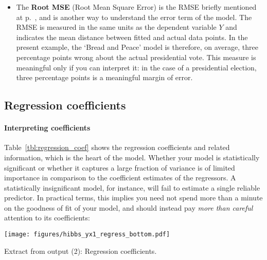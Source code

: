\begin{itemize}

		\item\label{rmse_explained} The \textbf{Root MSE} (Root Mean Square Error) is the RMSE briefly mentioned at p.~\pageref{rmse}, and is another way to understand the error term of the model. The RMSE is measured in the same units as the dependent variable $Y$ and indicates the mean distance between fitted and actual data points. In the present example, the `Bread and Peace' model is therefore, on average, three percentage points wrong about the actual presidential vote. This measure is meaningful only if you can interpret it: in the case of a presidential election, three percentage points is a meaningful margin of error.

	\end{itemize}

	\subsection{Regression coefficients}
	\paragraph{Interpreting coefficients}%
	\label{sec:coefficients}%
	Table~\ref{tbl:regression_coef} shows the regression coefficients and related information, which is the heart of the model. Whether your model is statistically significant or whether it captures a large fraction of variance is of limited importance in comparison to the coefficient estimates of the regressors. A statistically insignificant model, for instance, will fail to estimate a single reliable predictor. In practical terms, this implies you need not spend more than a minute on the goodness of fit of your model, and should instead pay \emph{more than careful} attention to its coefficients:

	\begin{table}[htp]
		\texttt{[image: figures/hibbs\_yx1\_regress\_bottom.pdf]}

	  	\caption[Extract from  output (2): Regression coefficients]{\label{tbl:regression_coef}
		Extract from  output (2): Regression coefficients.\\
		}
	\end{table}%

